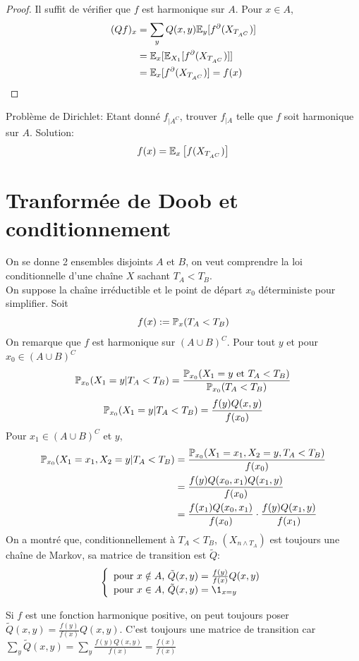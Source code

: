 \documentclass[]{report}
\begin{document}
    \begin{proof}
        Il suffit de vérifier que $f$ est harmonique sur $A$. Pour $x\in A$,
        \begin{align*}
            (Qf)_x&=\sum_y Q(x,y)\mathbb{E}_{y}[f^\partial (X_{T_{A^C}})]\\
            &=\mathbb{E}_{x}[\mathbb{E}_{X_1}[f^{\partial} (X_{T_{A^C}})]]\\
            &=\mathbb{E}_{x}[f^\partial(X_{T_{A^C}})]=f(x)
        \end{align*}
    \end{proof}

    Problème de Dirichlet: Etant donné $f_{|A^C}$, trouver $f_{|A}$ telle que $f$ soit harmonique sur $A$. Solution:
    \[f(x)=\mathbb{E}_x\left[ f(X_{T_{A^C}})\right]\]

    \section{Tranformée de Doob et conditionnement}

    On se donne 2 ensembles disjoints $A$ et $B$, on veut comprendre la loi conditionnelle d'une chaîne $X$ sachant $T_A< T_B$.\\
    On suppose la chaîne irréductible et le point de départ $x_0$ déterministe pour simplifier. Soit
    \[f(x):=\mathbb{P}_x(T_A<T_B)\]
    On remarque que $f$ est harmonique sur $(A\cup B)^C$. Pour tout $y$ et pour $x_0\in (A\cup B)^C$
    \[\mathbb{P}_{x_0}(X_1=y|T_A<T_B)=\frac{\mathbb{P}_{x_0}(X_1=y\text{ et }T_A<T_B)}{\mathbb{P}_{x_0}(T_A<T_B)}\]
    \[\mathbb{P}_{x_0}(X_1=y|T_A<T_B)=\frac{f(y)Q(x,y)}{f(x_0)}\]
    Pour $x_1\in (A\cup B)^C$ et $y$,
    \begin{align*}
        \mathbb{P}_{x_0}(X_1=x_1,X_2=y| T_A<T_B)&=\frac{\mathbb{P}_{x_0}(X_1=x_1,X_2=y,T_A<T_B)}{f(x_0)}\\
        &=\frac{f(y)Q(x_0,x_1)Q(x_1,y)}{f(x_0)}\\
        &=\frac{f(x_1)Q(x_0,x_1)}{f(x_0)}\cdot \frac{f(y)Q(x_1,y)}{f(x_1)}
    \end{align*}
    On a montré que, conditionnellement à $T_A<T_B$, $(X_{n\wedge T_A})$ est toujours une chaîne de Markov, sa matrice de transition est $\tilde{Q}$:\\
    \[\cho{\text{pour $x\notin A$, }\tilde{Q}(x,y)=\frac{f(y)}{f(x)}Q(x,y)\\
    \text{pour $x\in A$, }\tilde{Q}(x,y)=\1_{x=y}}\]

    \begin{re}{}{}
        Si $f$ est une fonction harmonique positive, on peut toujours poser $\tilde{Q}(x,y)=\frac{f(y)}{f(x)}Q(x,y)$. C'est toujours une matrice de transition car $\sum_y\tilde{Q}(x,y)=\sum_y\frac{f(y)Q(x,y)}{f(x)}=\frac{f(x)}{f(x)}$
    \end{re}
\end{document}
